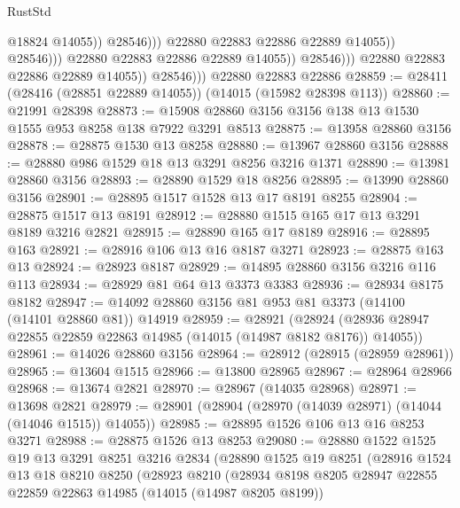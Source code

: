 \begin{lexlean}{RustStd}
\begin{coremodule}
                                            @18824
                                            @14055))
                                        @28546)))
                                  @22880
                                  @22883
                                  @22886
                                  @22889
                                  @14055))
                              @28546)))
                        @22880
                        @22883
                        @22886
                        @22889
                        @14055))
                    @28546)))
              @22880
              @22883
              @22886
              @22889
              @14055))
          @28546)))
    @22880
    @22883
    @22886
@28859 := @28411 (@28416 (@28851 @22889 @14055)) (@14015 (@15982 @28398 @113))
@28860 := @21991 @28398
@28873 := @15908 @28860 @3156 @3156 @138 @13 @1530 @1555 @953 @8258 @138 @7922 @3291 @8513
@28875 := @13958 @28860 @3156
@28878 := @28875 @1530 @13 @8258
@28880 := @13967 @28860 @3156
@28888 := @28880 @986 @1529 @18 @13 @3291 @8256 @3216 @1371
@28890 := @13981 @28860 @3156
@28893 := @28890 @1529 @18 @8256
@28895 := @13990 @28860 @3156
@28901 := @28895 @1517 @1528 @13 @17 @8191 @8255
@28904 := @28875 @1517 @13 @8191
@28912 := @28880 @1515 @165 @17 @13 @3291 @8189 @3216 @2821
@28915 := @28890 @165 @17 @8189
@28916 := @28895 @163
@28921 := @28916 @106 @13 @16 @8187 @3271
@28923 := @28875 @163 @13
@28924 := @28923 @8187
@28929 := @14895 @28860 @3156 @3216 @116 @113
@28934 := @28929 @81 @64 @13 @3373 @3383
@28936 := @28934 @8175 @8182
@28947 := @14092 @28860 @3156 @81 @953 @81 @3373 (@14100 (@14101 @28860 @81)) @14919
@28959 := @28921
    (@28924 (@28936 @28947 @22855 @22859 @22863 @14985 (@14015 (@14987 @8182 @8176)) @14055))
@28961 := @14026 @28860 @3156
@28964 := @28912 (@28915 (@28959 @28961))
@28965 := @13604 @1515
@28966 := @13800 @28965
@28967 := @28964 @28966
@28968 := @13674 @2821
@28970 := @28967 (@14035 @28968)
@28971 := @13698 @2821
@28979 := @28901 (@28904 (@28970 (@14039 @28971) (@14044 (@14046 @1515)) @14055))
@28985 := @28895 @1526 @106 @13 @16 @8253 @3271
@28988 := @28875 @1526 @13 @8253
@29080 := @28880
    @1522
    @1525
    @19
    @13
    @3291
    @8251
    @3216
    @2834
    (@28890
      @1525
      @19
      @8251
      (@28916
        @1524
        @13
        @18
        @8210
        @8250
        (@28923
          @8210
          (@28934
            @8198
            @8205
            @28947
            @22855
            @22859
            @22863
            @14985
            (@14015 (@14987 @8205 @8199))

\end{coremodule}
\end{lexlean}
